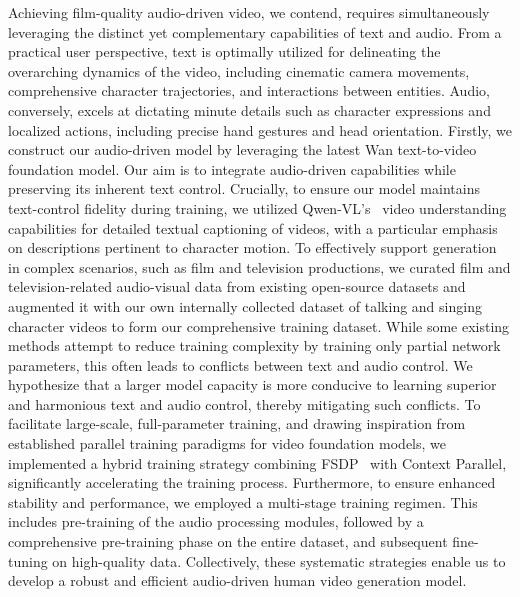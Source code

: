 Achieving film-quality audio-driven video, we contend, requires simultaneously leveraging the distinct yet complementary capabilities of text and audio. From a practical user perspective, text is optimally utilized for delineating the overarching dynamics of the video, including cinematic camera movements, comprehensive character trajectories, and interactions between entities. Audio, conversely, excels at dictating minute details such as character expressions and localized actions, including precise hand gestures and head orientation.
Firstly, we construct our audio-driven model by leveraging the latest Wan text-to-video foundation model\cite{wan2025}. Our aim is to integrate audio-driven capabilities while preserving its inherent text control. Crucially, to ensure our model maintains text-control fidelity during training, we utilized Qwen-VL's~\cite{Qwen2.5-VL} video understanding capabilities for detailed textual captioning of videos, with a particular emphasis on descriptions pertinent to character motion.
To effectively support generation in complex scenarios, such as film and television productions, we curated film and television-related audio-visual data from existing open-source datasets and augmented it with our own internally collected dataset of talking and singing character videos to form our comprehensive training dataset.
While some existing methods attempt to reduce training complexity by training only partial network parameters, this often leads to conflicts between text and audio control. We hypothesize that a larger model capacity is more conducive to learning superior and harmonious text and audio control, thereby mitigating such conflicts. To facilitate large-scale, full-parameter training, and drawing inspiration from established parallel training paradigms for video foundation models, we implemented a hybrid training strategy combining FSDP~\cite{fsdp} with Context Parallel, significantly accelerating the training process.
Furthermore, to ensure enhanced stability and performance, we employed a multi-stage training regimen. This includes pre-training of the audio processing modules, followed by a comprehensive pre-training phase on the entire dataset, and subsequent fine-tuning on high-quality data. Collectively, these systematic strategies enable us to develop a robust and efficient audio-driven human video generation model.



